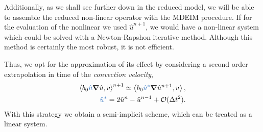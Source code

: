 \documentclass[../../thesis.tex]{subfiles}
\newcommand{\inner}[2]{\left<#1, #2\right>}
\newcommand{\dt}{\ensuremath{\Delta t}}
\begin{document}
Additionally, as we shall see further down in the reduced model, 
we will be able to assemble the reduced non-linear operator with the MDEIM procedure.
If for the evaluation of the nonlinear we used $\hat{u}^{n+1}$, 
we would have a non-linear system which could be solved with a Newton-Rapshon iterative method.
Although this method is certainly the most robust, it is not efficient. 

Thus, we opt for the approximation of its effect by considering a second order extrapolation in time 
of the \textit{convection velocity},
\begin{subequations}
    \begin{align}
        \inner{b_0 \textcolor{NavyBlue}{\hat{u}} \grad \hat{u}}{v}^{n+1} 
        \simeq 
        \inner{b_0 \textcolor{NavyBlue}{\hat{u}^{*}} \grad \hat{u}^{n+1}}{v}, \\
        \textcolor{NavyBlue}{\hat{u}^{*}} = 2 \hat{u}^{n} - \hat{u}^{n-1} + \mathcal{O}(\dt^2).
    \end{align}
\end{subequations}
With this strategy we obtain a semi-implicit scheme, which can be treated as a linear system.
\end{document}
